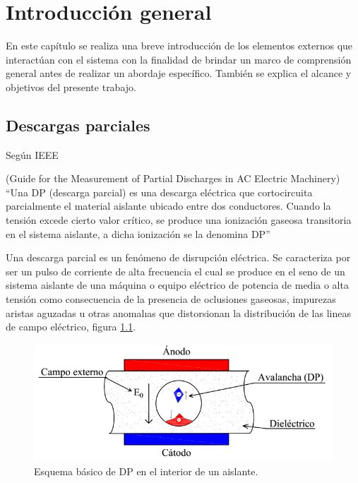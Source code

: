 
\chapter{Introducción general} %

\label{Chapter1} %
\label{IntroGeneral}
En este capítulo se realiza una breve introducción de los elementos externos que interactúan con el sistema con la finalidad de brindar un marco de comprensión general antes de realizar un abordaje específico. También se explica el alcance y objetivos del presente trabajo.


\newcommand{\keyword}[1]{\textbf{#1}}
\newcommand{\tabhead}[1]{\textbf{#1}}
\newcommand{\code}[1]{\texttt{#1}}
\newcommand{\file}[1]{\texttt{\bfseries#1}}
\newcommand{\option}[1]{\texttt{\itshape#1}}
\newcommand{\grados}{$^{\circ}$}

\section{Descargas parciales}
Según IEEE

(Guide for the Measurement of Partial Discharges in AC Electric Machinery)
\enquote{Una DP (descarga parcial) es una descarga eléctrica que cortocircuita parcialmente el material aislante ubicado entre dos conductores. Cuando la tensión excede cierto valor crítico, se produce una ionización gaseosa transitoria en el sistema aislante, a dicha ionización se la denomina DP} \citep{IEEE:citation}

Una descarga parcial es un fenómeno de disrupción eléctrica. Se caracteriza por ser un pulso de corriente de alta frecuencia el cual se produce en el seno de un sistema aislante de una máquina o equipo eléctrico de potencia de media o alta tensión como consecuencia de la presencia de  oclusiones gaseosas, impurezas aristas aguzadas u otras anomalıas que distorsionan la distribución de las lineas de campo eléctrico, figura \ref{fig:basicoDp}.

\begin{figure}[ht]
	\centering
	\includegraphics[width=\textwidth]{./Figures/basicoDp.png}
	\caption{Esquema básico de DP en el interior de un aislante.}
	\label{fig:basicoDp}
\end{figure}

